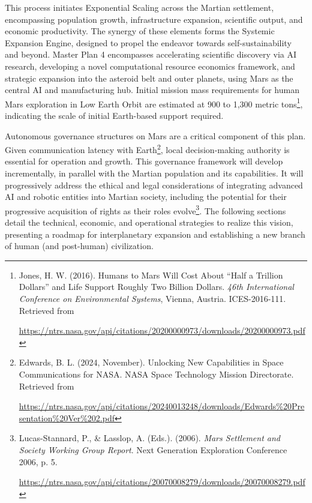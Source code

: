 \documentclass[fontsize=10pt, oneside, DIV=calc]{scrartcl}
\begin{document}
\medskip

\noindent
This process initiates Exponential Scaling across the Martian settlement, encompassing population growth, infrastructure expansion, scientific output, and economic productivity. The synergy of these elements forms the Systemic Expansion Engine, designed to propel the endeavor towards self-sustainability and beyond. Master Plan 4 encompasses accelerating scientific discovery via AI research, developing a novel computational resource economics framework, and strategic expansion into the asteroid belt and outer planets, using Mars as the central AI and manufacturing hub. Initial mission mass requirements for human Mars exploration in Low Earth Orbit are estimated at 900 to 1,300 metric tons\footnote{Jones, H. W. (2016). Humans to Mars Will Cost About ``Half a Trillion Dollars'' and Life Support Roughly Two Billion Dollars. \textit{46th International Conference on Environmental Systems}, Vienna, Austria. ICES-2016-111. Retrieved from 







\href{https://ntrs.nasa.gov/api/citations/20200000973/downloads/20200000973.pdf}\url{https://ntrs.nasa.gov/api/citations/20200000973/downloads/20200000973.pdf}}, indicating the scale of initial Earth-based support required.

\medskip

\noindent
Autonomous governance structures on Mars are a critical component of this plan. Given communication latency with Earth\footnote{Edwards, B. L. (2024, November). Unlocking New Capabilities in Space Communications for NASA. NASA Space Technology Mission Directorate. Retrieved from 







\href{https://ntrs.nasa.gov/api/citations/20240013248/downloads/Edwards\%20Presentation\_Ver\%202.pdf}\url{https://ntrs.nasa.gov/api/citations/20240013248/downloads/Edwards\%20Presentation\%20Ver\%202.pdf}}, local decision-making authority is essential for operation and growth. This governance framework will develop incrementally, in parallel with the Martian population and its capabilities. It will progressively address the ethical and legal considerations of integrating advanced AI and robotic entities into Martian society, including the potential for their progressive acquisition of rights as their roles evolve\footnote{Lucas-Stannard, P., \& Lasslop, A. (Eds.). (2006). \textit{Mars Settlement and Society Working Group Report}. Next Generation Exploration Conference 2006, p. 5. 







\href{https://ntrs.nasa.gov/api/citations/20070008279/downloads/20070008279.pdf}\url{https://ntrs.nasa.gov/api/citations/20070008279/downloads/20070008279.pdf}}. The following sections detail the technical, economic, and operational strategies to realize this vision, presenting a roadmap for interplanetary expansion and establishing a new branch of human (and post-human) civilization.
\end{document}
